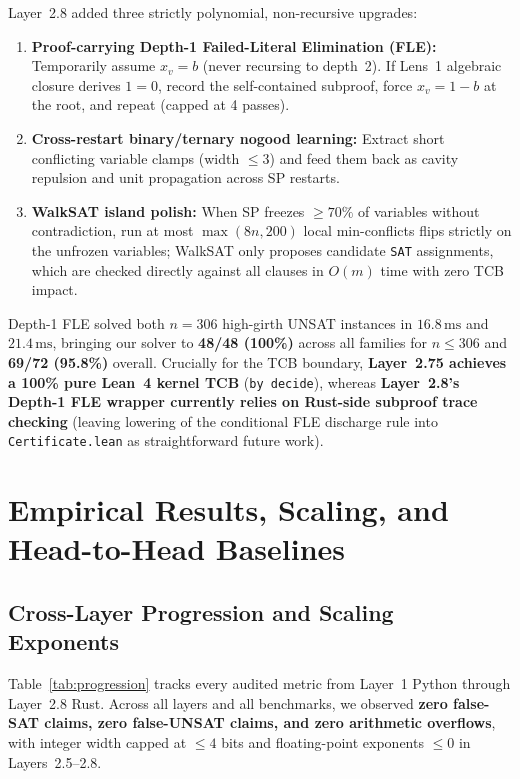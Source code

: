 \documentclass[11pt]{article}
\begin{document}
Layer~2.8 added three strictly polynomial, non-recursive upgrades:
\begin{enumerate}
  \item \textbf{Proof-carrying Depth-1 Failed-Literal Elimination (FLE):} Temporarily assume $x_v = b$ (never recursing to depth~2). If Lens~1 algebraic closure derives $1 = 0$, record the self-contained subproof, force $x_v = 1 - b$ at the root, and repeat (capped at 4 passes).
  \item \textbf{Cross-restart binary/ternary nogood learning:} Extract short conflicting variable clamps (width $\le 3$) and feed them back as cavity repulsion and unit propagation across SP restarts.
  \item \textbf{WalkSAT island polish:} When SP freezes $\ge 70\%$ of variables without contradiction, run at most $\max(8n, 200)$ local min-conflicts flips strictly on the unfrozen variables; WalkSAT only proposes candidate \texttt{SAT} assignments, which are checked directly against all clauses in $O(m)$ time with zero TCB impact.
\end{enumerate}

Depth-1 FLE solved both $n = 306$ high-girth UNSAT instances in $16.8\,\text{ms}$ and $21.4\,\text{ms}$, bringing our solver to \textbf{48/48 (100\%)} across all families for $n \le 306$ and \textbf{69/72 (95.8\%)} overall. Crucially for the TCB boundary, \textbf{Layer~2.75 achieves a 100\% pure Lean~4 kernel TCB} (\texttt{by decide}), whereas \textbf{Layer~2.8's Depth-1 FLE wrapper currently relies on Rust-side subproof trace checking} (leaving lowering of the conditional FLE discharge rule into \texttt{Certificate.lean} as straightforward future work).

\section{Empirical Results, Scaling, and Head-to-Head Baselines}

\subsection{Cross-Layer Progression and Scaling Exponents}

Table~\ref{tab:progression} tracks every audited metric from Layer~1 Python through Layer~2.8 Rust. Across all layers and all benchmarks, we observed \textbf{zero false-SAT claims, zero false-UNSAT claims, and zero arithmetic overflows}, with integer width capped at $\le 4$ bits and floating-point exponents $\le 0$ in Layers~2.5--2.8.
\end{document}
